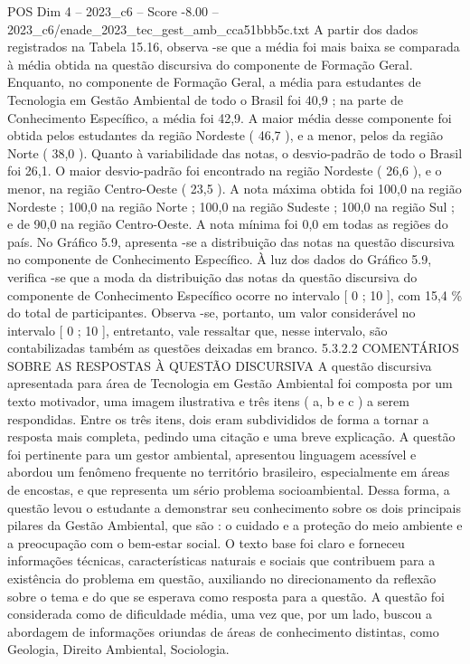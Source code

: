 \begin{textsample}{POS Dim 4 – 2023\_c6 – Score -8.00 – 2023\_c6/enade\_2023\_tec\_gest\_amb\_cca51bbb5c.txt}
A partir dos dados registrados na Tabela 15.16, observa -se que a média foi mais baixa se comparada à média obtida na questão discursiva do componente de Formação Geral.
Enquanto, no componente de Formação Geral, a média para estudantes de Tecnologia em Gestão Ambiental de todo o Brasil foi 40,9 ; na parte de Conhecimento Específico, a média foi 42,9.
A maior média desse componente foi obtida pelos estudantes da região Nordeste ( 46,7 ), e a menor, pelos da região Norte ( 38,0 ).
Quanto à variabilidade das notas, o desvio-padrão de todo o Brasil foi 26,1.
O maior desvio-padrão foi encontrado na região Nordeste ( 26,6 ), e o menor, na região Centro-Oeste ( 23,5 ).
A nota máxima obtida foi 100,0 na região Nordeste ; 100,0 na região Norte ; 100,0 na região Sudeste ; 100,0 na região Sul ; e de 90,0 na região Centro-Oeste.
A nota mínima foi 0,0 em todas as regiões do país.
No Gráfico 5.9, apresenta -se a distribuição das notas na questão discursiva no componente de Conhecimento Específico.
À luz dos dados do Gráfico 5.9, verifica -se que a moda da distribuição das notas da questão discursiva do componente de Conhecimento Específico ocorre no intervalo [ 0 ; 10 ], com 15,4 \% do total de participantes.
Observa -se, portanto, um valor considerável no intervalo [ 0 ; 10 ], entretanto, vale ressaltar que, nesse intervalo, são contabilizadas também as questões deixadas em branco. 5.3.2.2 COMENTÁRIOS SOBRE AS RESPOSTAS À QUESTÃO DISCURSIVA A questão discursiva apresentada para área de Tecnologia em Gestão Ambiental foi composta por um texto motivador, uma imagem ilustrativa e três itens ( a, b e c ) a serem respondidas.
Entre os três itens, dois eram subdivididos de forma a tornar a resposta mais completa, pedindo uma citação e uma breve explicação.
A questão foi pertinente para um gestor ambiental, apresentou linguagem acessível e abordou um fenômeno frequente no território brasileiro, especialmente em áreas de encostas, e que representa um sério problema socioambiental.
Dessa forma, a questão levou o estudante a demonstrar seu conhecimento sobre os dois principais pilares da Gestão Ambiental, que são : o cuidado e a proteção do meio ambiente e a preocupação com o bem-estar social.
O texto base foi claro e forneceu informações técnicas, características naturais e sociais que contribuem para a existência do problema em questão, auxiliando no direcionamento da reflexão sobre o tema e do que se esperava como resposta para a questão.
A questão foi considerada como de dificuldade média, uma vez que, por um lado, buscou a abordagem de informações oriundas de áreas de conhecimento distintas, como Geologia, Direito Ambiental, Sociologia.

\end{textsample}
